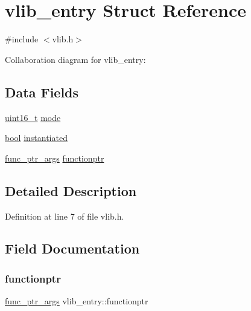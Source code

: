 \hypertarget{a00320}{}\section{vlib\+\_\+entry Struct Reference}
\label{a00320}


{\ttfamily \#include $<$vlib.\+h$>$}



Collaboration diagram for vlib\+\_\+entry\+:
\subsection*{Data Fields}
\begin{DoxyCompactItemize}
\item 
\hyperlink{a00140_a273cf69d639a59973b6019625df33e30_a273cf69d639a59973b6019625df33e30}{uint16\+\_\+t} \hyperlink{a00320_a46df5a47ac05a46ce871e5132153949c_a46df5a47ac05a46ce871e5132153949c}{mode}
\item 
\hyperlink{a00140_af6a258d8f3ee5206d682d799316314b1_af6a258d8f3ee5206d682d799316314b1}{bool} \hyperlink{a00320_ab67e2f60e6622a2d0b7c8a3ac6fd7c71_ab67e2f60e6622a2d0b7c8a3ac6fd7c71}{instantiated}
\item 
\hyperlink{a00140_ab22fa604a9d0187c6a648586ee77944f_ab22fa604a9d0187c6a648586ee77944f}{func\+\_\+ptr\+\_\+args} \hyperlink{a00320_a5d194ce83e680c074ac0a0641af42be6_a5d194ce83e680c074ac0a0641af42be6}{functionptr}
\end{DoxyCompactItemize}


\subsection{Detailed Description}


Definition at line 7 of file vlib.\+h.



\subsection{Field Documentation}
\mbox{\label{a00320_a5d194ce83e680c074ac0a0641af42be6_a5d194ce83e680c074ac0a0641af42be6}} 
\subsubsection{\texorpdfstring{functionptr}{functionptr}}
{\footnotesize\ttfamily \hyperlink{a00140_ab22fa604a9d0187c6a648586ee77944f_ab22fa604a9d0187c6a648586ee77944f}{func\+\_\+ptr\+\_\+args} vlib\+\_\+entry\+::functionptr}



